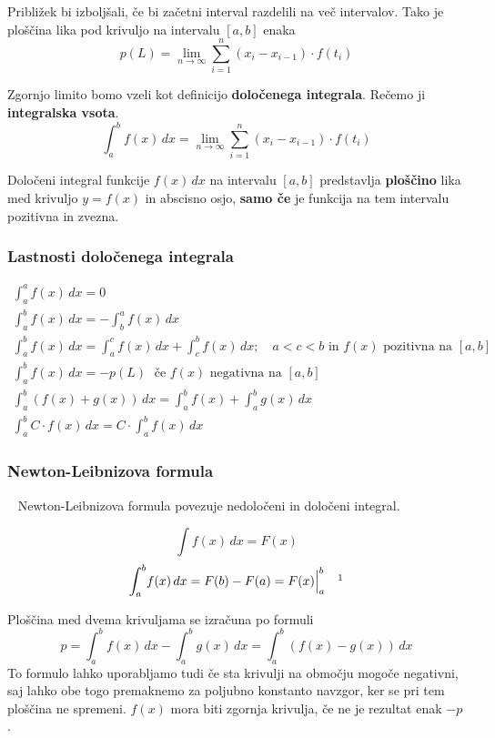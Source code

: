 \documentclass[a4paper,oneside,12pt,fleqn]{article}
\newcommand\krat\cdot
\def\limi{\displaystyle\lim_{n\to\infty}} %
\renewcommand{\d}{\ensuremath{\,d}} %
\newcommand{\dx}{\ensuremath{\d x}}
\numberwithin{equation}{section}
\begin{document}
Približek bi izboljšali, če bi začetni interval razdelili na več intervalov. Tako je
ploščina lika pod krivuljo na intervalu $[a,b]$ enaka
\[  p(L) = \limi\sum_{i=1}^{n}\left( x_i-x_{i-1}\right)\krat f(t_i) \]

Zgornjo limito bomo vzeli kot definicijo \textbf{določenega integrala}. Rečemo ji
\textbf{integralska vsota}.
\begin{equation}
  \int_a^b\!f(x)\dx = \limi\sum_{i=1}^{n}\left( x_i-x_{i-1}\right)\krat f(t_i)
  \label{eq:int:dint:def}
\end{equation}

Določeni integral funkcije $f(x)\dx$ na intervalu $[a,b]$ predstavlja \textbf{ploščino} lika med
krivuljo $y=f(x)$ in abscisno osjo, \textbf{samo če} je funkcija na tem intervalu pozitivna in
zvezna.

\subsubsection{Lastnosti določenega integrala}
\label{sec:dint:last}
\begin{gather*}
  \int_a^a\!f(x)\dx = 0 \\
  \int_a^b\!f(x)\dx = -\int_b^a\!f(x)\dx \\
  \int_a^b\!f(x)\dx = \int_a^c\!f(x)\dx + \int_c^b\!f(x)\dx;\quad a < c < b \text{ in
  $f(x)$ pozitivna na $[a,b]$} \\
  \int_a^b\!f(x)\dx = -p(L) \; \text{ če $f(x)$ negativna na $[a,b]$} \\
  \int_a^b\!\left( f(x)+g(x) \right)\dx = \int_a^b\!f(x) + \int_a^b\!g(x)\dx \\
  \int_a^b\!C\krat f(x)\dx = C\krat \int_a^b\!f(x)\dx
\end{gather*}

\subsubsection{Newton-Leibnizova formula}\
\label{sec:dint:newlei}
Newton-Leibnizova formula povezuje nedoločeni in določeni integral.

\[ \int\!f(x)\dx = F(x) \]
\[ \int_a^b\!f(x)\dx = F(b) - F(a) = F(x)\Big|_a^b \quad \footnotemark\]

Ploščina med dvema krivuljama se izračuna po formuli
\[ p = \int_a^b\!f(x)\dx-\int_a^b\!g(x)\dx = \int_a^b\!\left( f(x)-g(x) \right)\dx \]
To formulo lahko uporabljamo tudi če sta krivulji na območju mogoče negativni, saj lahko
obe togo premaknemo za poljubno konstanto navzgor, ker se pri tem ploščina ne spremeni.
$f(x)$ mora biti zgornja krivulja, če ne je rezultat enak $-p$.
\end{document}
